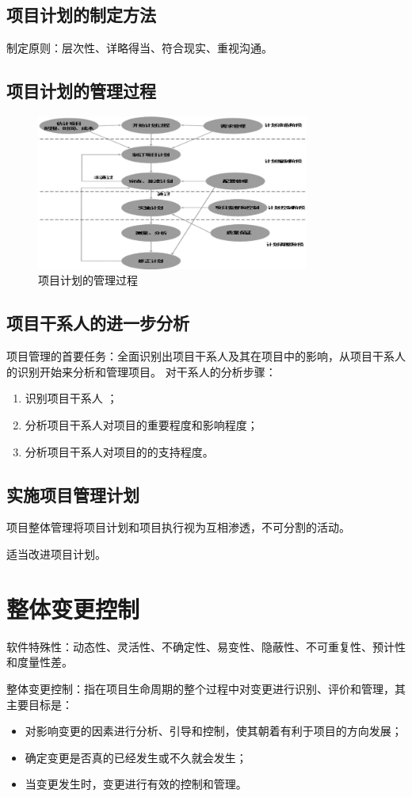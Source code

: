 \subsection{项目计划的制定方法}
制定原则：层次性、详略得当、符合现实、重视沟通。
\subsection{项目计划的管理过程}
\begin{figure}[!h]
	\centering
	\includegraphics[width=0.8\textwidth]{image/3-2}
	\caption{项目计划的管理过程}
\end{figure}
\subsection{项目干系人的进一步分析}
项目管理的首要任务：全面识别出项目干系人及其在项目中的影响，从项目干系人的识别开始来分析和管理项目。
对干系人的分析步骤：
\begin{enumerate}
	\item 识别项目干系人 ；
	\item 分析项目干系人对项目的重要程度和影响程度；
	\item 分析项目干系人对项目的的支持程度。
\end{enumerate}
\subsection{实施项目管理计划}
项目整体管理将项目计划和项目执行视为互相渗透，不可分割的活动。
\par 适当改进项目计划。
\section{整体变更控制}
软件特殊性：动态性、灵活性、不确定性、易变性、隐蔽性、不可重复性、预计性和度量性差。
\par 整体变更控制：指在项目生命周期的整个过程中对变更进行识别、评价和管理，其主要目标是：
\begin{itemize}
	\item 对影响变更的因素进行分析、引导和控制，使其朝着有利于项目的方向发展；
	\item 确定变更是否真的已经发生或不久就会发生；
	\item 当变更发生时，变更进行有效的控制和管理。
\end{itemize}
